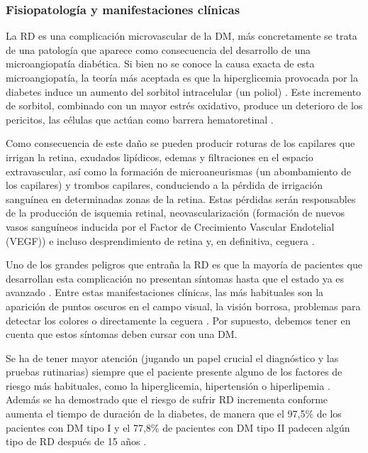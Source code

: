 \subsubsection{Fisiopatología y manifestaciones clínicas}

La RD es una complicación microvascular de la DM, más concretamente se trata de una patología que aparece como consecuencia del desarrollo de una microangiopatía diabética. Si bien no se conoce la causa exacta de esta microangiopatía, la teoría más aceptada es que la hiperglicemia provocada por la diabetes induce un aumento del sorbitol intracelular (un poliol) \cite{retinopatia:cheung}. Este incremento de sorbitol, combinado con un mayor estrés oxidativo, produce un deterioro de los pericitos, las células que actúan como barrera hematoretinal \cite{retinopatia:chile}.

Como consecuencia de este daño se pueden producir roturas de los capilares que irrigan la retina, exudados lipídicos, edemas  y filtraciones en el espacio extravascular, así como la formación de microaneurismas (un abombamiento de los capilares) y trombos capilares, conduciendo a la pérdida de irrigación sanguínea en determinadas zonas de la retina. Estas pérdidas serán responsables de la producción de isquemia retinal, neovascularización (formación de nuevos vasos sanguíneos inducida por el Factor de Crecimiento Vascular Endotelial (VEGF)) e incluso desprendimiento de retina y, en definitiva, ceguera \cite{retinopatia:chile,retinopatia:cheung}. 

Uno de los grandes peligros que entraña la RD es que la mayoría de pacientes que desarrollan esta complicación no presentan síntomas hasta que el estado ya es avanzado \cite{diabetes:JDI}. Entre estas manifestaciones clínicas, las más habituales son la aparición de puntos oscuros en el campo visual, la visión borrosa, problemas para detectar los colores o directamente la ceguera \cite{retinopatia:sintomas}. Por supuesto, debemos tener en cuenta que estos síntomas deben cursar con una DM.

Se ha de tener mayor atención (jugando un papel crucial el diagnóstico y las pruebas rutinarias) siempre que el paciente presente alguno de los factores de riesgo más habituales, como la hiperglicemia, hipertensión o hiperlipemia \cite{diabetes:JDI}. Además se ha demostrado que el riesgo de sufrir RD incrementa conforme aumenta el tiempo de duración de la diabetes, de manera que el 97,5\% de los pacientes con DM tipo I y el 77,8\% de pacientes con DM tipo II padecen algún tipo de RD después de 15 años \cite{retinopatia:chile}.

